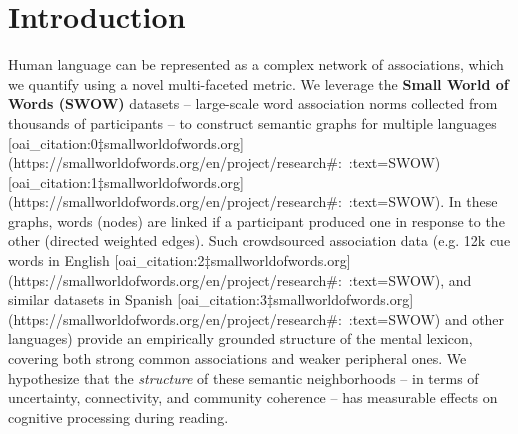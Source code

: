 \section*{Introduction}
Human language can be represented as a complex network of associations, which we quantify using a novel multi-faceted metric. We leverage the \textbf{Small World of Words (SWOW)} datasets – large-scale word association norms collected from thousands of participants – to construct semantic graphs for multiple languages [oai_citation:0‡smallworldofwords.org](https://smallworldofwords.org/en/project/research#:~:text=SWOW) [oai_citation:1‡smallworldofwords.org](https://smallworldofwords.org/en/project/research#:~:text=SWOW). In these graphs, words (nodes) are linked if a participant produced one in response to the other (directed weighted edges). Such crowdsourced association data (e.g. 12k cue words in English [oai_citation:2‡smallworldofwords.org](https://smallworldofwords.org/en/project/research#:~:text=SWOW), and similar datasets in Spanish [oai_citation:3‡smallworldofwords.org](https://smallworldofwords.org/en/project/research#:~:text=SWOW) and other languages) provide an empirically grounded structure of the mental lexicon, covering both strong common associations and weaker peripheral ones. We hypothesize that the \textit{structure} of these semantic neighborhoods – in terms of uncertainty, connectivity, and community coherence – has measurable effects on cognitive processing during reading.

